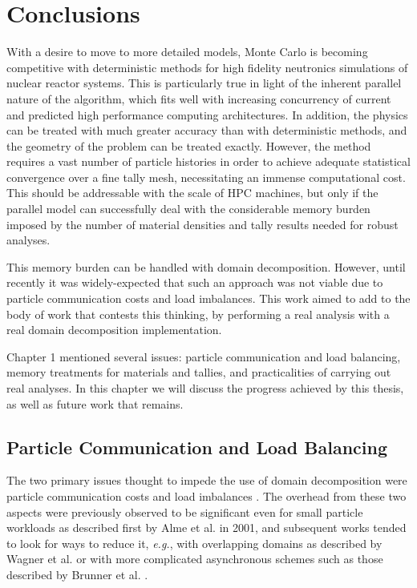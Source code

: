 \chapter{Conclusions}
\label{chap:conclusions}

With a desire to move to more detailed models, Monte Carlo is becoming
competitive with deterministic methods for high fidelity neutronics simulations
of nuclear reactor systems. This is particularly true in light of the inherent
parallel nature of the algorithm, which fits well with increasing
concurrency of current and predicted high performance computing architectures.
In addition, the physics can be treated with much greater accuracy than with
deterministic methods, and the geometry of the problem can be treated exactly.
However, the method requires a vast number of particle histories in order to
achieve adequate statistical convergence over a fine tally mesh, necessitating an
immense computational cost. This should be addressable with the scale of HPC
machines, but only if the parallel model can successfully deal with the
considerable memory burden imposed by the number of material densities and tally
results needed for robust analyses.

This memory burden can be handled with domain decomposition. However, until
recently it was widely-expected that such an approach was not viable due to
particle communication costs and load imbalances. This work aimed to add to the
body of work that contests this thinking, by performing a real analysis with a
real domain decomposition implementation.

Chapter 1 mentioned several issues: particle communication and load balancing,
memory treatments for materials and tallies, and practicalities of carrying out
real analyses. In this chapter we will discuss the progress achieved by this
thesis, as well as future work that remains.

\section{Particle Communication and Load Balancing}

The two primary issues thought to impede the use of domain decomposition were
particle communication costs and load imbalances \cite{forrest_mc_prospects,
martin_chall}. The overhead from these two aspects were previously observed to
be significant even for small particle workloads as described first by Alme et
al. \cite{js-alme-2001} in 2001, and subsequent works tended to look for ways
to reduce it, \emph{e.g.}, with overlapping domains as described by Wagner et
al.\cite{wagner_dd} or with more complicated asynchronous schemes such as those
described by Brunner et al. \cite{Brunner20093882}.

